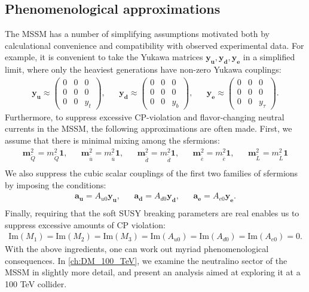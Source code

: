 \subsection{Phenomenological approximations}
The MSSM has a number of simplifying assumptions motivated both by calculational convenience and compatibility with observed experimental data. For example, it is convenient to take the Yukawa matrices $\mathbf{y_u,y_d,y_e}$ in a simplified limit, where only the heaviest generations have non-zero Yukawa couplings:
\begin{align*}
  \mathbf{y_u} \approx \begin{pmatrix}
    0 & 0 & 0\\
    0 & 0 & 0\\
    0 & 0 & y_t
  \end{pmatrix},&&
  \mathbf{y_d} \approx \begin{pmatrix}
    0 & 0 & 0\\
    0 & 0 & 0\\
    0 & 0 & y_b
  \end{pmatrix},&&
  \mathbf{y_e} \approx \begin{pmatrix}
    0 & 0 & 0\\
    0 & 0 & 0\\
    0 & 0 & y_\tau
  \end{pmatrix}.
\end{align*}
Furthermore, to suppress excessive CP-violation and flavor-changing neutral currents in the MSSM, the following approximations are often made. First, we assume that there is minimal mixing among the sfermions:
\begin{align*}
  \mathbf{m}_{\widetilde{Q}}^2 = m_{\widetilde{Q}}^2\mathbf{1},&&
  \mathbf{m}_{\widetilde{\overline{u}}}^2 = m_{\widetilde{\overline{u}}}^2\mathbf{1},&&
  \mathbf{m}_{\widetilde{\overline{d}}}^2 = m_{\widetilde{\overline{d}}}^2\mathbf{1},&&
  \mathbf{m}_{\widetilde{\overline{e}}}^2 = m_{\widetilde{\overline{e}}}^2\mathbf{1},&&
  \mathbf{m}_{\widetilde{L}}^2 = m_{\widetilde{L}}^2\mathbf{1}\\
\end{align*}
We also suppress the cubic scalar couplings of the first two families of sfermions by imposing the conditions: 
\begin{align*}
  \mathbf{a_u} = A_{u0}\mathbf{y_u},&&
  \mathbf{a_d} = A_{d0}\mathbf{y_d},&&
  \mathbf{a_e} = A_{e0}\mathbf{y_e}.\\
\end{align*}
Finally, requiring that the soft SUSY breaking parameters are real enables us to suppress excessive amounts of CP violation:
\begin{align*}
  \text{Im}(M_1)=
  \text{Im}(M_2)=
  \text{Im}(M_3)=
  \text{Im}(A_{u0})=
  \text{Im}(A_{d0})=
  \text{Im}(A_{e0})=0.
\end{align*}
With the above ingredients, one can work out myriad phenomenological consequences. In \autoref{ch:DM_100_TeV}, we examine the neutralino sector of the MSSM in slightly more detail, and present an analysis aimed at exploring it at a 100 TeV collider.
